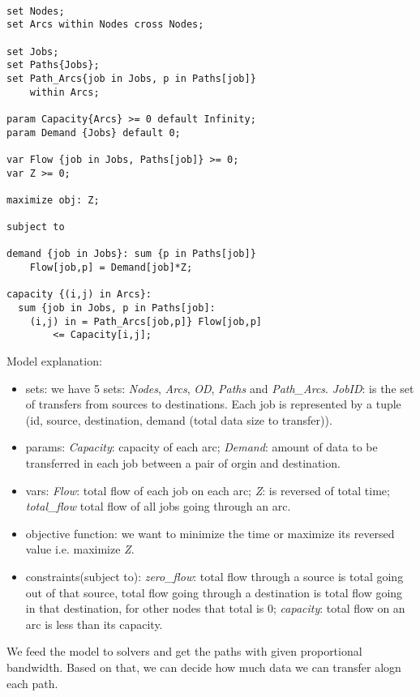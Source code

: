 \begin{verbatim}

set Nodes;
set Arcs within Nodes cross Nodes;

set Jobs;
set Paths{Jobs};
set Path_Arcs{job in Jobs, p in Paths[job]} 
    within Arcs;

param Capacity{Arcs} >= 0 default Infinity;
param Demand {Jobs} default 0;

var Flow {job in Jobs, Paths[job]} >= 0;
var Z >= 0;

maximize obj: Z;

subject to

demand {job in Jobs}: sum {p in Paths[job]} 
	Flow[job,p] = Demand[job]*Z;

capacity {(i,j) in Arcs}:
  sum {job in Jobs, p in Paths[job]: 
    (i,j) in = Path_Arcs[job,p]} Flow[job,p] 
		<= Capacity[i,j];

\end{verbatim}

\endgroup

Model explanation:
\begin{itemize}
\item sets: we have 5 sets: \textit{Nodes}, \textit{Arcs}, \textit{OD}, \textit{Paths} and \textit{Path\_Arcs}. \textit{JobID}: is the set of transfers from sources to destinations. Each job is represented by a tuple (id, source, destination, demand (total data size to transfer)).
\item params: {\it Capacity}: capacity of each arc; {\it Demand}: amount of data to be transferred in each job between a pair of orgin and destination.
\item vars: \textit{Flow}: total flow of each job on each arc; \textit{Z}: is reversed of total time; \textit{total\_flow} total flow of all jobs going through an arc.
\item objective function: we want to minimize the time or maximize its reversed value i.e. maximize \textit{Z}.
\item constraints(subject to): \textit{zero\_flow}: total flow through a source is total going out of that source, total flow going through a destination is total flow going in that destination, for other nodes that total is 0; \textit{capacity}: total flow on an arc is less than its capacity.
\end{itemize}

We feed the model to solvers and get the paths with given proportional bandwidth. Based on that, we can decide how much data we can transfer alogn each path.

